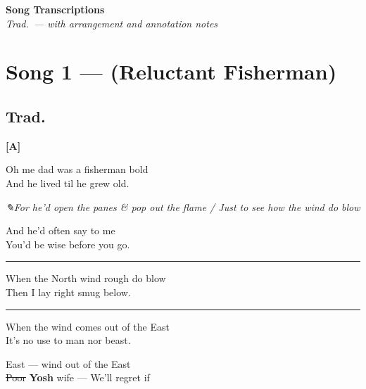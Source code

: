 \documentclass[11pt, a4paper]{article}
\newcommand{\struck}[1]{{\color{strikegray}\sout{#1}}}
\newcommand{\ins}[1]{{\bfseries #1}}
\newcommand{\sidecue}[1]{%
  \marginnote{\itshape\small\color{sidegreen}#1}%
}
\newcommand{\blueink}[1]{%
  \par\noindent\hspace{1em}%
  {\ttfamily\footnotesize\color{blueinkcol}\itshape
   {\symbolfont ✎}\enspace #1}\par%
}
\newenvironment{alt}{%
  \par\vspace{2pt}%
  \noindent\hspace{1.5em}%
  \begin{minipage}[t]{0.82\linewidth}%
  \small\itshape\color{altpurple}%
  \setlength{\leftskip}{6pt}%
}{%
  \end{minipage}\par\vspace{2pt}%
}
\newenvironment{songverse}{%
  \vspace{0.5em}\noindent%
}{%
  \vspace{0.5em}\par%
}
\newcommand{\structlabel}[1]{%
  \vspace{0.8em}\noindent%
  {\ttfamily\small\bfseries\color{black!70}\MakeUppercase{#1}}%
  \vspace{0.3em}\par%
}
\begin{document}

\begin{center}
  {\LARGE\bfseries Song Transcriptions}\\[0.4em]
  {\small\itshape Trad.\ --- with arrangement and annotation notes}
\end{center}
\vspace{1em}
\tableofcontents
\newpage

\section{Song 1 --- (Reluctant Fisherman)}
\subsection*{Trad.}

\structlabel{[A]}

\begin{songverse}
\begin{bracketgroup}
Oh me dad was a fisherman bold\\
And he lived til he grew old. \sidecue{For\ldots}
\blueink{For he'd open the panes \& pop out the flame / Just to see how the wind do blow}
And he'd often say to me\\
You'd be wise before you go. \sidecue{Do\ldots}
\end{bracketgroup}
\end{songverse}

\medskip\hrule\medskip

\begin{songverse}
\begin{bracketgroup}
When the North wind rough do blow\\
Then I lay right smug below. \sidecue{But\ldots}
\end{bracketgroup}
\end{songverse}

\medskip\hrule\medskip

\begin{songverse}
\begin{bracketgroup}
When the wind comes out of the East\\
It's no use to man nor beast. \sidecue{But\ldots}
\begin{alt}
East --- wind out of the East\\
\struck{Poor} \ins{Yosh} wife --- We'll regret if
\end{alt}
\end{bracketgroup}
\end{songverse}
\end{document}

